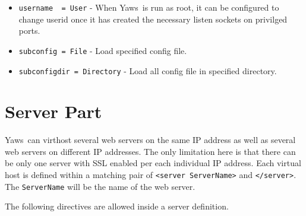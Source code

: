 \documentclass[11pt,oneside,english]{book}
\newcommand{\Yaws}            %
        {{\sc Yaws}}
\begin{document}
\begin{itemize}
\item        \verb+username  = User+ -
             When \Yaws\  is run as root, it can be configured to
             change userid once it has created the necessary
             listen sockets on privilged ports.

\item        \verb+subconfig = File+ -
             Load specified config file.

\item        \verb+subconfigdir = Directory+ -
             Load all config file in specified directory.

\end{itemize}



\section{Server Part}

\Yaws\ can virthost several web servers on the same IP address as well
as several web servers on different IP addresses.  The only limitation
here is that there can be only one server with SSL enabled per each
individual IP address.  Each virtual host is defined within a matching
pair of \verb+<server ServerName>+ and \verb+</server>+.  The
\verb+ServerName+ will be the name of the web server.

The following directives are allowed inside a server definition.
\end{document}
